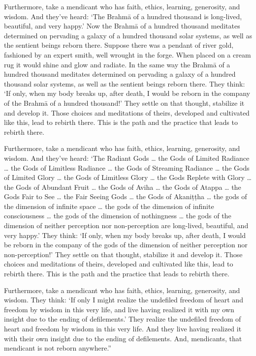 \documentclass[12pt,openany]{book}%
\begin{document}
Furthermore, take a mendicant who has faith, ethics, learning, generosity, and wisdom. And they’ve heard: ‘The \textsanskrit{Brahmā} of a hundred thousand is long-lived, beautiful, and very happy.’ Now the \textsanskrit{Brahmā} of a hundred thousand meditates determined on pervading a galaxy of a hundred thousand solar systems, as well as the sentient beings reborn there. Suppose there was a pendant of river gold, fashioned by an expert smith, well wrought in the forge. When placed on a cream rug it would shine and glow and radiate. In the same way the \textsanskrit{Brahmā} of a hundred thousand meditates determined on pervading a galaxy of a hundred thousand solar systems, as well as the sentient beings reborn there. They think: ‘If only, when my body breaks up, after death, I would be reborn in the company of the \textsanskrit{Brahmā} of a hundred thousand!’ They settle on that thought, stabilize it and develop it. Those choices and meditations of theirs, developed and cultivated like this, lead to rebirth there. This is the path and the practice that leads to rebirth there. 

Furthermore, take a mendicant who has faith, ethics, learning, generosity, and wisdom. And they’ve heard: ‘The Radiant Gods … the Gods of Limited Radiance … the Gods of Limitless Radiance … the Gods of Streaming Radiance … the Gods of Limited Glory … the Gods of Limitless Glory … the Gods Replete with Glory … the Gods of Abundant Fruit … the Gods of Aviha … the Gods of Atappa … the Gods Fair to See … the Fair Seeing Gods … the Gods of \textsanskrit{Akaniṭṭha} … the gods of the dimension of infinite space … the gods of the dimension of infinite consciousness … the gods of the dimension of nothingness … the gods of the dimension of neither perception nor non-perception are long-lived, beautiful, and very happy.’ They think: ‘If only, when my body breaks up, after death, I would be reborn in the company of the gods of the dimension of neither perception nor non-perception!’ They settle on that thought, stabilize it and develop it. Those choices and meditations of theirs, developed and cultivated like this, lead to rebirth there. This is the path and the practice that leads to rebirth there. 

Furthermore, take a mendicant who has faith, ethics, learning, generosity, and wisdom. They think: ‘If only I might realize the undefiled freedom of heart and freedom by wisdom in this very life, and live having realized it with my own insight due to the ending of defilements.’ They realize the undefiled freedom of heart and freedom by wisdom in this very life. And they live having realized it with their own insight due to the ending of defilements. And, mendicants, that mendicant is not reborn anywhere.” 
\end{document}
